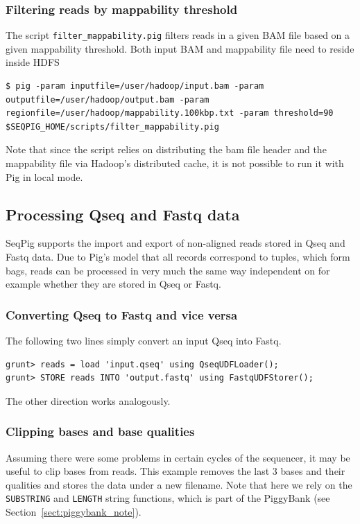 \subsubsection{Filtering reads by mappability threshold}
The script {\tt filter\_mappability.pig} filters reads in a given BAM file based on a given
mappability threshold. Both input BAM and mappability file need to reside inside HDFS
\begin{lstlisting}
$ pig -param inputfile=/user/hadoop/input.bam -param outputfile=/user/hadoop/output.bam -param regionfile=/user/hadoop/mappability.100kbp.txt -param threshold=90 $SEQPIG_HOME/scripts/filter_mappability.pig
\end{lstlisting}
Note that since the script relies on distributing the bam file header and the
mappability file via Hadoop's distributed cache, it is not possible to run it
with Pig in local mode.

\subsection{Processing Qseq and Fastq data}

SeqPig supports the import and export of non-aligned reads stored in Qseq and
Fastq data. Due to Pig's model that all records correspond to tuples, which
form bags, reads can be processed in very much the same way independent
on for example whether they are stored in Qseq or Fastq.

\subsubsection{Converting Qseq to Fastq and vice versa}

The following two lines simply convert an input Qseq into Fastq.
\begin{lstlisting}
grunt> reads = load 'input.qseq' using QseqUDFLoader();
grunt> STORE reads INTO 'output.fastq' using FastqUDFStorer(); 
\end{lstlisting}
The other direction works analogously.

\subsubsection{Clipping bases and base qualities}

\label{sect:read_clipping}

Assuming there were some problems in certain cycles of the sequencer, it
may be useful to clip bases from reads. This example removes the last 3
bases and their qualities and stores the data under a new filename. Note
that here we rely on the {\tt SUBSTRING} and {\tt LENGTH} string functions, which is
part of the PiggyBank (see Section~\ref{sect:piggybank_note}).


